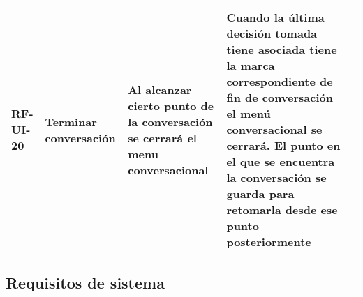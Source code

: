 \begin{table}[]
\begin{tabular}{lllll}
\multicolumn{1}{|l|}{\textbf{RF-UI-20}}      & \multicolumn{1}{l|}{Terminar conversación}         & \multicolumn{1}{l|}{Al alcanzar cierto punto de la conversación se cerrará el menu conversacional}     & \multicolumn{1}{l|}{Cuando la última decisión tomada tiene asociada tiene la marca correspondiente de fin de conversación el menú conversacional se cerrará. El punto en el que se encuentra la conversación se guarda para retomarla desde ese punto posteriormente} & \multicolumn{1}{l|}{}                   \\ \hline
                             
\end{tabular}
\end{table}

\subsection{Requisitos de sistema}


